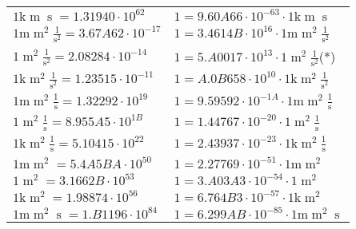 \begin{center}
\begin{longtable}{l l}
{\color{gray}$1 \bm{\mathrm{ k}}{\operatorname{m}}{\operatorname{s}}{}{} = 1.31940\cdot10^{62} $}   & {\color{gray}$ 1 = 9.60A66\cdot10^{-63} \cdot 1 \bm{\mathrm{ k}}{\operatorname{m}}{\operatorname{s}}{}{}$}  \\
{\color{gray}$1 \bm{\mathrm{ m}}{\operatorname{m}^2}\frac1{\operatorname{s}^2}{}{} = 3.67A62\cdot10^{-17} $}   & {\color{gray}$ 1 = 3.4614B\cdot10^{16} \cdot 1 \bm{\mathrm{ m}}{\operatorname{m}^2}\frac1{\operatorname{s}^2}{}{}$}  \\
{\color{black}$1 \bm{\mathrm{ }}{\operatorname{m}^2}\frac1{\operatorname{s}^2}{}{} = 2.08284\cdot10^{-14} $}   & {\color{black}$ 1 = 5.A0017\cdot10^{13} \cdot 1 \bm{\mathrm{ }}{\operatorname{m}^2}\frac1{\operatorname{s}^2}{}{}$}\quad(*)\\
{\color{gray}$1 \bm{\mathrm{ k}}{\operatorname{m}^2}\frac1{\operatorname{s}^2}{}{} = 1.23515\cdot10^{-11} $}   & {\color{gray}$ 1 = A.0B658\cdot10^{10} \cdot 1 \bm{\mathrm{ k}}{\operatorname{m}^2}\frac1{\operatorname{s}^2}{}{}$}  \\
{\color{gray}$1 \bm{\mathrm{ m}}{\operatorname{m}^2}\frac1{\operatorname{s}}{}{} = 1.32292\cdot10^{19} $}   & {\color{gray}$ 1 = 9.59592\cdot10^{-1A} \cdot 1 \bm{\mathrm{ m}}{\operatorname{m}^2}\frac1{\operatorname{s}}{}{}$}  \\
{\color{black}$1 \bm{\mathrm{ }}{\operatorname{m}^2}\frac1{\operatorname{s}}{}{} = 8.955A5\cdot10^{1B} $}   & {\color{black}$ 1 = 1.44767\cdot10^{-20} \cdot 1 \bm{\mathrm{ }}{\operatorname{m}^2}\frac1{\operatorname{s}}{}{}$}  \\
{\color{gray}$1 \bm{\mathrm{ k}}{\operatorname{m}^2}\frac1{\operatorname{s}}{}{} = 5.10415\cdot10^{22} $}   & {\color{gray}$ 1 = 2.43937\cdot10^{-23} \cdot 1 \bm{\mathrm{ k}}{\operatorname{m}^2}\frac1{\operatorname{s}}{}{}$}  \\
{\color{gray}$1 \bm{\mathrm{ m}}{\operatorname{m}^2}{}{}{} = 5.4A5BA\cdot10^{50} $}   & {\color{gray}$ 1 = 2.27769\cdot10^{-51} \cdot 1 \bm{\mathrm{ m}}{\operatorname{m}^2}{}{}{}$}  \\
{\color{black}$1 \bm{\mathrm{ }}{\operatorname{m}^2}{}{}{} = 3.1662B\cdot10^{53} $}   & {\color{black}$ 1 = 3.A03A3\cdot10^{-54} \cdot 1 \bm{\mathrm{ }}{\operatorname{m}^2}{}{}{}$}  \\
{\color{gray}$1 \bm{\mathrm{ k}}{\operatorname{m}^2}{}{}{} = 1.98874\cdot10^{56} $}   & {\color{gray}$ 1 = 6.764B3\cdot10^{-57} \cdot 1 \bm{\mathrm{ k}}{\operatorname{m}^2}{}{}{}$}  \\
{\color{gray}$1 \bm{\mathrm{ m}}{\operatorname{m}^2}{\operatorname{s}}{}{} = 1.B1196\cdot10^{84} $}   & {\color{gray}$ 1 = 6.299AB\cdot10^{-85} \cdot 1 \bm{\mathrm{ m}}{\operatorname{m}^2}{\operatorname{s}}{}{}$}  \\

\end{longtable}
\end{center}
